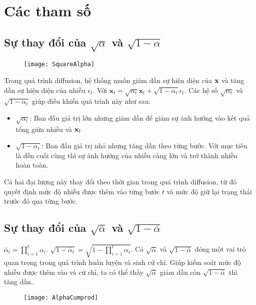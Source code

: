 \appendix

\chapter{Các tham số}
 \label{Appendix1}

\section{Sự thay đổi của $\sqrt{\alpha}$ và $\sqrt{1 - \alpha}$}

\begin{figure}
	\texttt{[image: SquareAlpha]}
	\label{fig:wrapfig}
\end{figure}

Trong quá trình diffusion, hệ thống muốn giảm dần sự hiện diện của $\mathbf{x}$ và tăng dần sự hiện diện của nhiễu $\epsilon_t$. Với $\mathbf{x}_t = \sqrt{\alpha_t} \mathbf{x}_t + \sqrt{1 - \alpha_t} \epsilon_t$. Các hệ số $\sqrt{\alpha_t}$ và $\sqrt{1 - \alpha_t}$ giúp điều khiển quá trình này như sau:



\begin{itemize}
	\item $\sqrt{\alpha_t}$: Ban đầu giá trị lớn nhưng giảm dần để giảm sự ảnh hưởng vào kết quả tổng giữa nhiễu và $\mathbf{x}_t$
	\item $\sqrt{1 - \alpha_t}$: Ban đầu giá trị nhỏ nhưng tăng dần theo từng bước. Với mục tiêu là đến cuối cùng thì sự ảnh hưởng của nhiễu càng lớn và trở thành nhiễu hoàn toàn.
\end{itemize}


Cả hai đại lượng này thay đổi theo thời gian trong quá trình diffusion, từ đó quyết định mức độ nhiễu được thêm vào từng bước $t$ và mức độ giữ lại trạng thái trước đó qua từng bước.


\section{Sự thay đổi của $\sqrt{\bar{\alpha}}$ và $\sqrt{1 - \bar{\alpha}}$}

$\bar{\alpha}_t = \prod_{i=1}^t \alpha_i$.  $\sqrt{1 - \bar{\alpha}_t} = \sqrt{1 - \prod_{i=1}^t \alpha_i}$. Cả $\sqrt{\bar{\alpha}}$ và $\sqrt{1 - \bar{\alpha}}$ đóng một vai trò quan trọng trong quá trình huấn luyện và sinh cử chỉ. Giúp kiểm soát mức độ nhiễu được thêm vào và cử chỉ, ta có thể thấy $\sqrt{\bar{\alpha}}$ giảm dần còn $\sqrt{1 - \bar{\alpha}}$ thì tăng dần..
\begin{figure}
	\texttt{[image: AlphaCumprod]}
	\label{fig:AlphaCumprod}
\end{figure}



